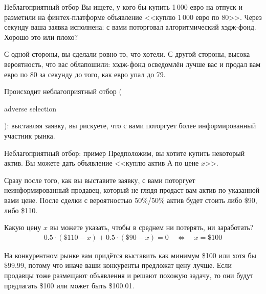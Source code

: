\documentclass{beamer}
\newcommand{\en}[1]{\begin{otherlanguage}{english}#1\end{otherlanguage}}
\begin{document}
\begin{frame}{Неблагоприятный отбор}
\justify
Вы ищете, у кого бы купить 1\,000 евро на отпуск и разметили на финтех-платформе
объявление <<куплю 1\,000 евро по 80>>. Через секунду ваша заявка 
исполнена: с вами поторговал алгоритмический хэдж-фонд. Хорошо это или плохо?

\justify
С одной стороны, вы сделали ровно то, что хотели. С другой стороны, высока 
вероятность, что вас облапошили: хэдж-фонд осведомлён лучше вас и продал вам
евро по 80 за секунду до того, как евро упал до 79.

\justify
Происходит \alert{неблагоприятный отбор} (\en{adverse selection}): выставляя 
заявку, вы рискуете, что с вами поторгует более информированный участник рынка.
\end{frame}



\begin{frame}{Неблагоприятный отбор: пример}
\justify
Предположим, вы хотите купить некоторый актив. Вы можете дать объявление 
<<куплю актив А по цене $x$>>.

\justify
Сразу после того, как вы выставите заявку, с вами поторгует неинформированный 
продавец, который не глядя продаст вам актив по указанной вами цене. После 
сделки с вероятностью 50\%/50\% актив будет стоить либо \$90, либо \$110.

\justify
Какую цену $x$ вы можете указать, чтобы в среднем ни потерять, ни заработать?
\begin{align*}
0.5\cdot(\$110 - x) + 0.5\cdot(\$90 - x) = 0 \quad \Leftrightarrow \quad x = \$100
\end{align*}

\justify
На конкурентном рынке вам придётся выставить как минимум \$100 или хотя бы  
\$99.99, потому что иначе ваши конкуренты предложат цену лучше. Если продавцы 
тоже размещают объявления и решают похожую задачу, то они будут предлагать \$100 
или может быть \$100.01.
\end{frame}
\end{document}
